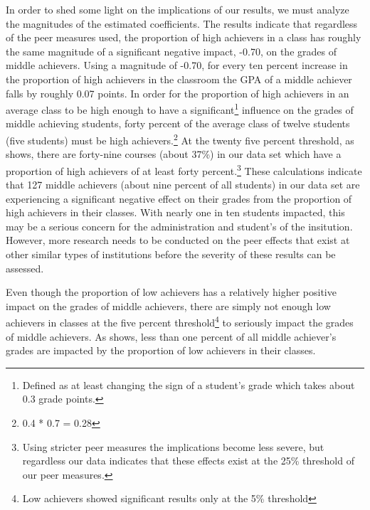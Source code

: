 In order to shed some light on the implications of our results, we must analyze the magnitudes of the estimated coefficients.
The results indicate that regardless of the peer measures used, the proportion of high achievers in a class has roughly the same magnitude of a significant negative impact, -0.70, on the grades of middle achievers. 
Using a magnitude of -0.70, for every ten percent increase in the proportion of high achievers in the classroom the GPA of a middle achiever falls by roughly 0.07 points. 
In order for the proportion of high achievers in an average class to be high enough to have a significant\footnote{Defined as at least changing the sign of a student's grade which takes about 0.3 grade points.} influence on the grades of middle achieving students, forty percent of the average class of twelve students (five students) must be high achievers.\footnote{0.4 * 0.7 = 0.28} 
At the twenty five percent threshold, as  shows, there are forty-nine courses (about 37\%) in our data set which have a proportion of high achievers of at least forty percent.\footnote{Using stricter peer measures the implications become less severe, but regardless our data indicates that these effects exist at the 25\% threshold of our peer measures.}  
These calculations indicate that 127 middle achievers (about nine percent of all students) in our data set are experiencing a significant negative effect on their grades from the proportion of high achievers in their classes. 
With nearly one in ten students impacted, this may be a serious concern for the administration and student's of the insitution.
However, more research needs to be conducted on the peer effects that exist at other similar types of institutions before the severity of these results can be assessed.

Even though the proportion of low achievers has a relatively higher positive impact on the grades of middle achievers, there are simply not enough low achievers in classes at the five percent threshold\footnote{Low achievers showed significant results only at the 5\% threshold} to seriously impact the grades of middle achievers.
As  shows, less than one percent of all middle achiever's grades are impacted by the proportion of low achievers in their classes. 

